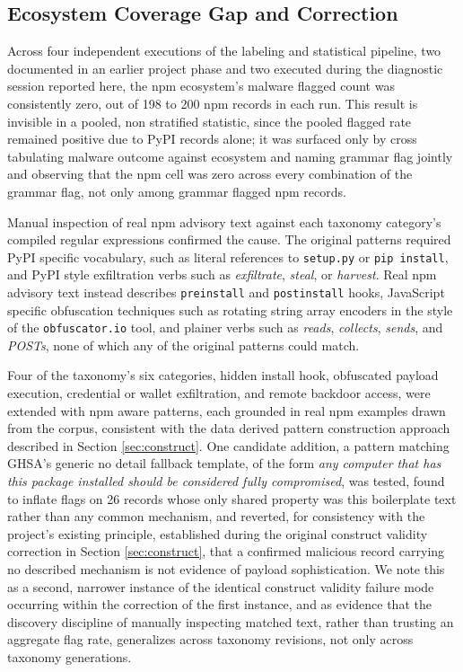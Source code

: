 \documentclass[journal]{IEEEtran}
\begin{document}
\subsection{Ecosystem Coverage Gap and Correction}
\label{sec:coverage}

Across four independent executions of the labeling and statistical pipeline, two documented in an earlier project phase and two executed during the diagnostic session reported here, the npm ecosystem's malware flagged count was consistently zero, out of 198 to 200 npm records in each run. This result is invisible in a pooled, non stratified statistic, since the pooled flagged rate remained positive due to PyPI records alone; it was surfaced only by cross tabulating malware outcome against ecosystem and naming grammar flag jointly and observing that the npm cell was zero across every combination of the grammar flag, not only among grammar flagged npm records.

Manual inspection of real npm advisory text against each taxonomy category's compiled regular expressions confirmed the cause. The original patterns required PyPI specific vocabulary, such as literal references to \texttt{setup.py} or \texttt{pip install}, and PyPI style exfiltration verbs such as \textit{exfiltrate}, \textit{steal}, or \textit{harvest}. Real npm advisory text instead describes \texttt{preinstall} and \texttt{postinstall} hooks, JavaScript specific obfuscation techniques such as rotating string array encoders in the style of the \texttt{obfuscator.io} tool, and plainer verbs such as \textit{reads}, \textit{collects}, \textit{sends}, and \textit{POSTs}, none of which any of the original patterns could match.

Four of the taxonomy's six categories, hidden install hook, obfuscated payload execution, credential or wallet exfiltration, and remote backdoor access, were extended with npm aware patterns, each grounded in real npm examples drawn from the corpus, consistent with the data derived pattern construction approach described in Section \ref{sec:construct}. One candidate addition, a pattern matching GHSA's generic no detail fallback template, of the form \textit{any computer that has this package installed should be considered fully compromised}, was tested, found to inflate flags on 26 records whose only shared property was this boilerplate text rather than any common mechanism, and reverted, for consistency with the project's existing principle, established during the original construct validity correction in Section \ref{sec:construct}, that a confirmed malicious record carrying no described mechanism is not evidence of payload sophistication. We note this as a second, narrower instance of the identical construct validity failure mode occurring within the correction of the first instance, and as evidence that the discovery discipline of manually inspecting matched text, rather than trusting an aggregate flag rate, generalizes across taxonomy revisions, not only across taxonomy generations.
\end{document}
